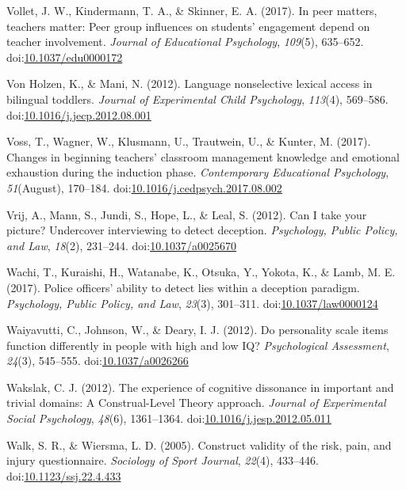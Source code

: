 \documentclass[english,man]{apa6}
\begin{document}
\hypertarget{ref-Vollet2017}{}
Vollet, J. W., Kindermann, T. A., \& Skinner, E. A. (2017). In peer
matters, teachers matter: Peer group influences on students' engagement
depend on teacher involvement. \emph{Journal of Educational Psychology},
\emph{109}(5), 635--652.
doi:\href{https://doi.org/10.1037/edu0000172}{10.1037/edu0000172}

\hypertarget{ref-VonHolzen2012}{}
Von Holzen, K., \& Mani, N. (2012). Language nonselective lexical access
in bilingual toddlers. \emph{Journal of Experimental Child Psychology},
\emph{113}(4), 569--586.
doi:\href{https://doi.org/10.1016/j.jecp.2012.08.001}{10.1016/j.jecp.2012.08.001}

\hypertarget{ref-Voss2017}{}
Voss, T., Wagner, W., Klusmann, U., Trautwein, U., \& Kunter, M. (2017).
Changes in beginning teachers' classroom management knowledge and
emotional exhaustion during the induction phase. \emph{Contemporary
Educational Psychology}, \emph{51}(August), 170--184.
doi:\href{https://doi.org/10.1016/j.cedpsych.2017.08.002}{10.1016/j.cedpsych.2017.08.002}

\hypertarget{ref-Vrij2012}{}
Vrij, A., Mann, S., Jundi, S., Hope, L., \& Leal, S. (2012). Can I take
your picture? Undercover interviewing to detect deception.
\emph{Psychology, Public Policy, and Law}, \emph{18}(2), 231--244.
doi:\href{https://doi.org/10.1037/a0025670}{10.1037/a0025670}

\hypertarget{ref-Wachi2017}{}
Wachi, T., Kuraishi, H., Watanabe, K., Otsuka, Y., Yokota, K., \& Lamb,
M. E. (2017). Police officers' ability to detect lies within a deception
paradigm. \emph{Psychology, Public Policy, and Law}, \emph{23}(3),
301--311.
doi:\href{https://doi.org/10.1037/law0000124}{10.1037/law0000124}

\hypertarget{ref-Waiyavutti2012}{}
Waiyavutti, C., Johnson, W., \& Deary, I. J. (2012). Do personality
scale items function differently in people with high and low IQ?
\emph{Psychological Assessment}, \emph{24}(3), 545--555.
doi:\href{https://doi.org/10.1037/a0026266}{10.1037/a0026266}

\hypertarget{ref-Wakslak2012}{}
Wakslak, C. J. (2012). The experience of cognitive dissonance in
important and trivial domains: A Construal-Level Theory approach.
\emph{Journal of Experimental Social Psychology}, \emph{48}(6),
1361--1364.
doi:\href{https://doi.org/10.1016/j.jesp.2012.05.011}{10.1016/j.jesp.2012.05.011}

\hypertarget{ref-Walk2005}{}
Walk, S. R., \& Wiersma, L. D. (2005). Construct validity of the risk,
pain, and injury questionnaire. \emph{Sociology of Sport Journal},
\emph{22}(4), 433--446.
doi:\href{https://doi.org/10.1123/ssj.22.4.433}{10.1123/ssj.22.4.433}
\end{document}
